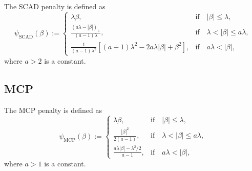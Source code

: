 The SCAD penalty is defined as
\begin{equation*}
	\psi_{\text{SCAD}}(\beta):=\left\{\begin{array}{ll}
		\lambda\beta,                                                                                  & \text{if}\quad\left|\beta\right|\leq\lambda,           \\
		\frac{\left(a\lambda-\left|\beta\right|\right)_{+}}{(a-1)\lambda},                             & \text{if}\quad\lambda<\left|\beta\right|\leq a\lambda, \\
		\frac{1}{(a-1)\lambda^{2}}\left[(a+1)\lambda^{2}-2a\lambda\left|\beta\right|+\beta^{2}\right], & \text{if}\quad a\lambda<\left|\beta\right|,
	\end{array}\right.
\end{equation*}
where $a>2$ is a constant.

\subsection{MCP}

The MCP penalty is defined as
\begin{equation*}
	\psi_{\text{MCP}}(\beta):=\left\{\begin{array}{ll}
		\lambda\beta,                                         & \text{if}\quad\left|\beta\right|\leq\lambda,           \\
		\frac{\left|\beta\right|^{2}}{2(a-1)},                & \text{if}\quad\lambda<\left|\beta\right|\leq a\lambda, \\
		\frac{a\lambda\left|\beta\right|-\lambda^{2}/2}{a-1}, & \text{if}\quad a\lambda<\left|\beta\right|,
	\end{array}\right.
\end{equation*}
where $a>1$ is a constant.

